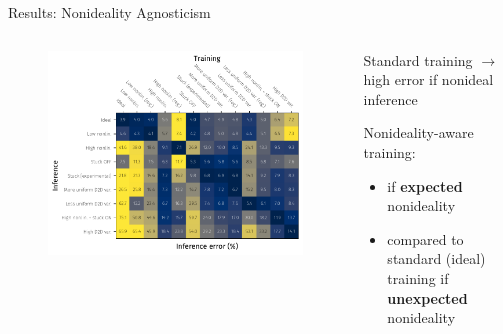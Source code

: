 \documentclass[
  aspectratio=169,
  hyperref={breaklinks=true, colorlinks, citecolor=blue, linkcolor=blue, urlcolor=blue},
]{beamer}
\begin{document}
\begin{frame}{Results: Nonideality Agnosticism}
  \begin{columns}
    \begin{column}{0.6\textwidth}
      \pause{}

      \begin{figure}
        \includegraphics[width=\linewidth]{figures/PDF/nonideality-agnosticism.pdf}
      \end{figure}
    \end{column}
    \begin{column}{0.4\textwidth}
      \pause{}

      Standard training $\rightarrow$ \alert{high error} if nonideal inference

      \pause{}
      \bigskip

      Nonideality-aware training:
      \pause{}
      \begin{itemize}[<+->]
        \item {} if \textbf{expected} nonideality
        \item {} compared to standard (ideal) training if \textbf{unexpected} nonideality
      \end{itemize}
    \end{column}
  \end{columns}
\end{frame}
\end{document}

